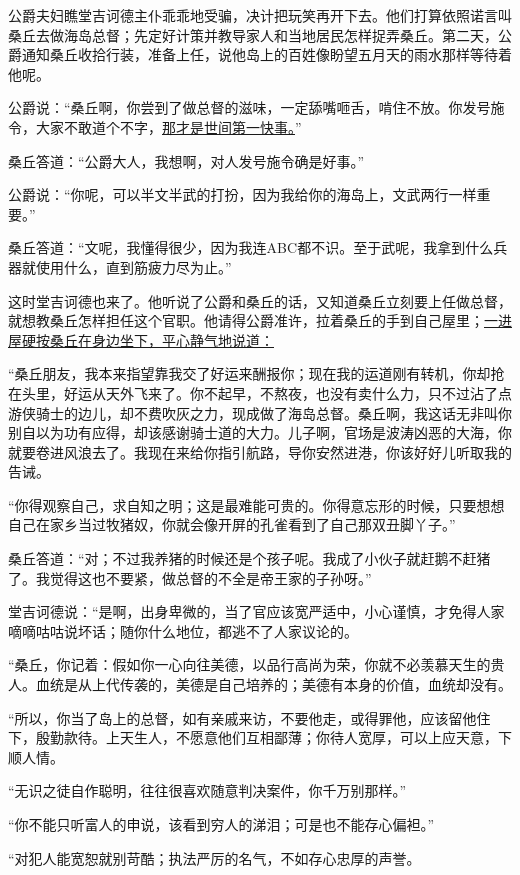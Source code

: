\documentclass[11pt,a4paper]{ctexart}
\begin{document}
\begin{materialtext}
公爵夫妇瞧堂吉诃德主仆乖乖地受骗，决计把玩笑再开下去。他们打算依照诺言叫桑丘去做海岛总督；先定好计策并教导家人和当地居民怎样捉弄桑丘。第二天，公爵通知桑丘收拾行装，准备上任，说他岛上的百姓像盼望五月天的雨水那样等待着他呢。

公爵说：“桑丘啊，你尝到了做总督的滋味，一定舔嘴咂舌，啃住不放。你发号施令，大家不敢道个不字，\uline{那才是世间第一快事。}”

桑丘答道：“公爵大人，我想啊，对人发号施令确是好事。”

公爵说：“你呢，可以半文半武的打扮，因为我给你的海岛上，文武两行一样重要。”

桑丘答道：“文呢，我懂得很少，因为我连ABC都不识。至于武呢，我拿到什么兵器就使用什么，直到筋疲力尽为止。”

这时堂吉诃德也来了。他听说了公爵和桑丘的话，又知道桑丘立刻要上任做总督，就想教桑丘怎样担任这个官职。他请得公爵准许，拉着桑丘的手到自己屋里；\uline{一进屋硬按桑丘在身边坐下，平心静气地说道：}

“桑丘朋友，我本来指望靠我交了好运来酬报你；现在我的运道刚有转机，你却抢在头里，好运从天外飞来了。你不起早，不熬夜，也没有卖什么力，只不过沾了点游侠骑士的边儿，却不费吹灰之力，现成做了海岛总督。桑丘啊，我这话无非叫你别自以为功有应得，却该感谢骑士道的大力。儿子啊，官场是波涛凶恶的大海，你就要卷进风浪去了。我现在来给你指引航路，导你安然进港，你该好好儿听取我的告诫。

“你得观察自己，求自知之明；这是最难能可贵的。你得意忘形的时候，只要想想自己在家乡当过牧猪奴，你就会像开屏的孔雀看到了自己那双丑脚丫子。”

桑丘答道：“对；不过我养猪的时候还是个孩子呢。我成了小伙子就赶鹅不赶猪了。我觉得这也不要紧，做总督的不全是帝王家的子孙呀。”

堂吉诃德说：“是啊，出身卑微的，当了官应该宽严适中，小心谨慎，才免得人家嘀嘀咕咕说坏话；随你什么地位，都逃不了人家议论的。

“桑丘，你记着：假如你一心向往美德，以品行高尚为荣，你就不必羡慕天生的贵人。血统是从上代传袭的，美德是自己培养的；美德有本身的价值，血统却没有。

“所以，你当了岛上的总督，如有亲戚来访，不要他走，或得罪他，应该留他住下，殷勤款待。上天生人，不愿意他们互相鄙薄；你待人宽厚，可以上应天意，下顺人情。

“无识之徒自作聪明，往往很喜欢随意判决案件，你千万别那样。”

“你不能只听富人的申说，该看到穷人的涕泪；可是也不能存心偏袒。”

“对犯人能宽恕就别苛酷；执法严厉的名气，不如存心忠厚的声誉。


\end{materialtext}
\end{document}
